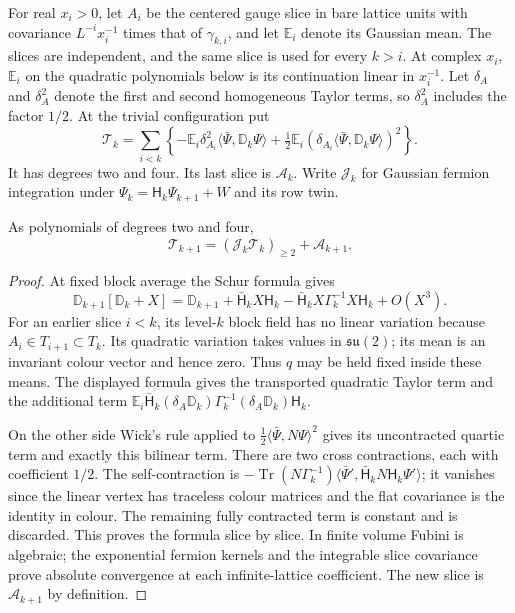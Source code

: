 \documentclass[11pt,letterpaper,reqno]{amsart}
\makeatletter
\theoremstyle{definition}
\newcommand{\ms@minorstart}{%
  \pushQED{\qed}\renewcommand{\qedsymbol}{$\blacksquare$}}
\newenvironment{lemma}[1][]{\ms@minorstart\ms@lemma[#1]}
  {\popQED\endms@lemma}
\theoremstyle{remark}
\makeatother
\begin{document}
For real $x_i>0$, let $A_i$ be the centered gauge slice in bare
lattice units with covariance $L^{-i}x_i^{-1}$ times that of
$\gamma_{k,i}$, and let $\mathbb E_i$ denote its Gaussian mean.
The slices are independent, and the same slice is used for
every $k>i$. At complex $x_i$, $\mathbb E_i$ on the quadratic
polynomials below is its continuation linear in $x_i^{-1}$.
Let $\delta_A$ and $\delta_A^2$ denote the first and second
homogeneous Taylor terms, so $\delta_A^2$ includes the factor
$1/2$.  At the trivial configuration put
\[
 \mathscr T_k=\sum_{i<k}
 \left\{-\mathbb E_i\delta_{A_i}^2
            \langle\bar\Psi,\mathbb D_k\Psi\rangle
 +\tfrac12\mathbb E_i
       (\delta_{A_i}\langle\bar\Psi,\mathbb D_k\Psi\rangle)^2
 \right\}.
\]
It has degrees two and four.  Its last slice is
$\mathscr A_k$.  Write $\mathcal J_k$ for Gaussian fermion
integration under
$\Psi_k=\mathsf H_k\Psi_{k+1}+W$ and its row twin.

\begin{lemma}[Transport of the second order]\label{C-398-20}
As polynomials of degrees two and four,
\[
 \mathscr T_{k+1}=(\mathcal J_k\mathscr T_k)_{\ge2}
                                      +\mathscr A_{k+1}.
\]
\end{lemma}

\begin{proof}
At fixed block average the Schur formula gives
\[
 \mathbb D_{k+1}[\mathbb D_k+X]
 =\mathbb D_{k+1}+\bar{\mathsf H}_kX\mathsf H_k
       -\bar{\mathsf H}_kX\Gamma_k^{-1}X\mathsf H_k+O(X^3).
\]
For an earlier slice $i<k$, its level-$k$ block field has no
linear variation because $A_i\in T_{i+1}\subset T_k$.
Its quadratic variation takes values in $\mathfrak{su}(2)$;
its mean is an invariant colour vector and hence zero.
Thus $q$ may be held fixed inside these means.  The displayed
formula gives the transported quadratic Taylor term and the
additional term
$\mathbb E_i\bar{\mathsf H}_k(\delta_A\mathbb D_k)
\Gamma_k^{-1}(\delta_A\mathbb D_k)\mathsf H_k$.

On the other side Wick's rule applied to
$\tfrac12\langle\bar\Psi,N\Psi\rangle^2$ gives its
uncontracted quartic term and exactly this bilinear term.
There are two cross contractions, each with coefficient
$1/2$.  The self-contraction is
$-\operatorname{Tr}(N\Gamma_k^{-1})
\langle\bar\Psi',\bar{\mathsf H}_kN\mathsf H_k\Psi'\rangle$;
it vanishes since the linear vertex has traceless colour
matrices and the flat covariance is the identity in colour.
The remaining fully contracted term is constant and is
discarded.  This proves the formula slice by slice.
In finite volume Fubini is algebraic; the exponential fermion
kernels and the integrable slice covariance prove absolute
convergence at each infinite-lattice coefficient.  The new
slice is $\mathscr A_{k+1}$ by definition.
\end{proof}
\end{document}
